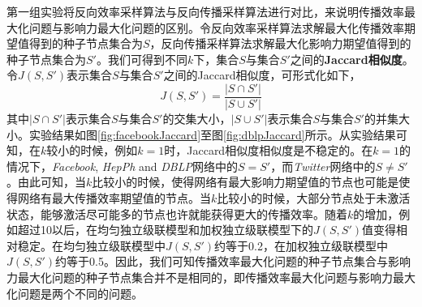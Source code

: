 第一组实验将反向效率采样算法与反向传播采样算法进行对比，来说明传播效率最大化问题与影响力最大化问题的区别。令反向效率采样算法求解最大化传播效率期望值得到的种子节点集合为$S$，反向传播采样算法求解最大化影响力期望值得到的种子节点集合为$S'$。我们可得到不同$k$下，集合$S$与集合$S'$之间的\textbf{Jaccard相似度}。令$J(S,S')$表示集合$S$与集合$S'$之间的Jaccard相似度，可形式化如下，
\begin{equation}\label{eq:jaccard}
    J(S,S') = \frac{\vert S \cap S' \vert}{\vert S \cup S' \vert}
\end{equation}
其中$\vert S \cap S' \vert$表示集合$S$与集合$S'$的交集大小，$\vert S \cup S' \vert$表示集合$S$与集合$S'$的并集大小。实验结果如图\ref{fig:facebookJaccard}至图\ref{fig:dblpJaccard}所示。从实验结果可知，在$k$较小的时候，例如$k=1$时，Jaccard相似度相似度是不稳定的。在$k=1$的情况下，\textit{Facebook}, \textit{HepPh} and \textit{DBLP}网络中的$S=S'$，而\textit{Twitter}网络中的$S \neq S'$。由此可知，当$k$比较小的时候，使得网络有最大影响力期望值的节点也可能是使得网络有最大传播效率期望值的节点。当$k$比较小的时候，大部分节点处于未激活状态，能够激活尽可能多的节点也许就能获得更大的传播效率。随着$k$的增加，例如超过10以后，在均匀独立级联模型和加权独立级联模型下的$J(S,S')$值变得相对稳定。在均匀独立级联模型中$J(S,S')$约等于0.2，在加权独立级联模型中$J(S,S')$约等于0.5。因此，我们可知传播效率最大化问题的种子节点集合与影响力最大化问题的种子节点集合并不是相同的，即传播效率最大化问题与影响力最大化问题是两个不同的问题。

